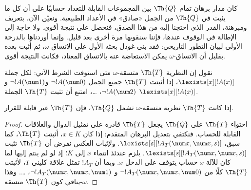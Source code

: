 \documentclass[../../../include/open-logic-section]{subfiles}
\begin{document}


\begin{explain}
كان مدار برهان تمام $\Th{Q}$ بين المجموعات القابلة للتعداد حسابيًا
على أن كل ما يثبت في $\Th{Q}$ من الجمل «صادق» في الأعداد الطبيعية.
ونعيّن الآن، بتعريف ومبرهنة، القدر الذي احتجنا إليه من هذا الصدق،
فنحصل على نتيجة أقوى. ولا حاجة إلى الإطالة في الوقوف عندها، فإننا
سنقويها مرة أخرى بعد قليل. وإنما أوردناها بالدرجة الأولى لبيان
التطور التاريخي: فقد بنى غودل بحثه الأول على الاتساق-$\omega$،
ثم أُثبت بعده بقليل أن الاتساق-$\omega$ يمكن الاستعاضة عنه بالاتساق
المعتاد، فكانت النتيجة أقوى.
\end{explain}

\begin{defn}
نقول إن النظرية $\Th{T}$ متسقة-$\omega$ متى استوفت الشرط الآتي:
لكل جملة $\lexists[x][!A(x)]$، إذا أثبتت $\Th{T}$ جميع الجمل
$\lnot !A(\num 0)$ و$\lnot !A(\num 1)$ و$\lnot !A(\num 2)$،
\dots، امتنع أن تثبت $\Th{T}$ الجملة $\lexists[x][!A(x)]$.
\end{defn}

\begin{thm}
  إذا كانت $\Th{T}$ نظرية متسقة-$\omega$ تشمل $\Th{Q}$،
  فإن $\Th{T}$ غير قابلة للقرار.
\end{thm}

\begin{proof}
احتواء $\Th{T}$ على $\Th{Q}$ يجعل $\Th{T}$ قادرة على تمثيل الدوال
والعلاقات القابلة للحساب. فنكتفي بتعديل البرهان المتقدم:
إذا كان $x\in K$، أثبتت $\Th{T}$، كما سبق،
$\lexists[s][!A_T(\num x,\num x,s)]$. ولإثبات العكس نفرض أن
$\Th{T}$ تثبت $\lexists[s][!A_T(\num x,\num x,s)]$.
يلزم عندئذ انتماء $x$ إلى $K$؛ إذ لو لم ينتم إليها لما كان للآلة
$x$ حساب يتوقف على الدخل $x$. وبما أن $!A_T$ تمثل علاقة كليني $T$،
لأثبتت $\Th{T}$ كلًا من
$\lnot !A_T(\num x,\num x,\num 0)$ و
$\lnot !A_T(\num x,\num x,\num 1)$، \dots. وهذا ينافي كون
$\Th{T}$ متسقة-$\omega$.
\end{proof}
\end{document}
